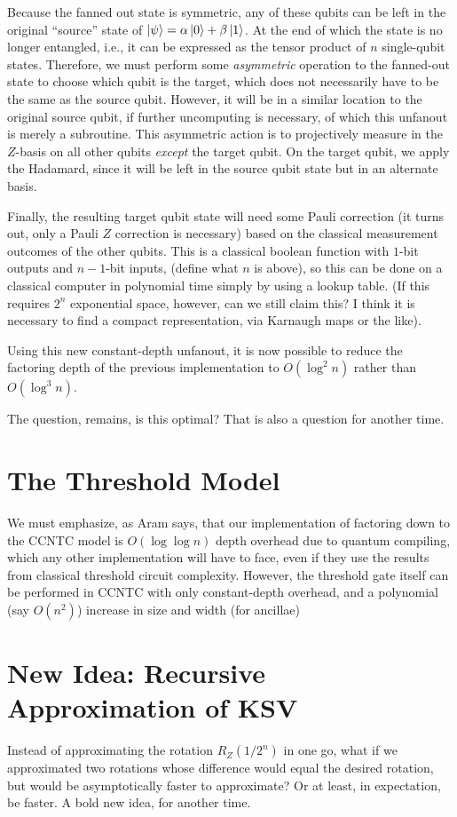 \documentclass{article}
\begin{document}
Because the fanned out state is symmetric, any of these qubits can be
left in the original ``source'' state of
$\left\vert{\psi}\right\rangle = \alpha\left\vert{0}\right\rangle + \beta\left\vert{1}\right\rangle$.
At the end of which the
state is no longer entangled, i.e., it can be expressed as the
tensor product of $n$ single-qubit states. Therefore, we must perform
some \emph{asymmetric} operation to the fanned-out state to choose
which qubit is the target, which does not necessarily have to be the
same as the source qubit. However, it will be in a similar location
to the original source qubit, if further uncomputing is necessary,
of which this unfanout is merely a subroutine. This asymmetric action
is to projectively measure in the $Z$-basis on all other qubits
\emph{except} the target qubit. On the target qubit, we apply the
Hadamard, since it will be left in the source qubit state but in
an alternate basis.

Finally, the resulting target qubit state will need some Pauli
correction (it turns out, only a Pauli $Z$ correction is necessary)
based on the classical measurement outcomes of the other qubits.
This is a classical boolean function with $1$-bit outputs and
$n-1$-bit inputs, (define what $n$ is above), so this can be
done on a classical computer in polynomial time simply by using
a lookup table. (If this requires $2^n$ exponential space, however,
can we still claim this? I think it is necessary to find a compact
representation, via Karnaugh maps or the like).

Using this new constant-depth unfanout, it is now possible to reduce
the factoring depth of the previous implementation to $O(\log ^2 n)$
rather than $O(\log^3 n)$.

The question, remains, is this optimal? That is also a question for
another time.

\section{The Threshold Model}

We must emphasize, as Aram says, that our implementation of factoring
down to the CCNTC model is $O(\log \log n)$ depth overhead due to
quantum compiling, which any other implementation will have to face,
even if they use the results from classical threshold circuit complexity.
However, the threshold gate itself can be performed in CCNTC with only
constant-depth overhead, and a polynomial (say $O(n^2)$) increase in
size and width (for ancillae)

\section{New Idea: Recursive Approximation of KSV}

Instead of approximating the rotation $R_Z(1/2^n)$ in one go, what if
we approximated two rotations whose difference would equal the
desired rotation, but would be asymptotically faster to approximate?
Or at least, in expectation, be faster. A bold new idea, for another time.
\end{document}

